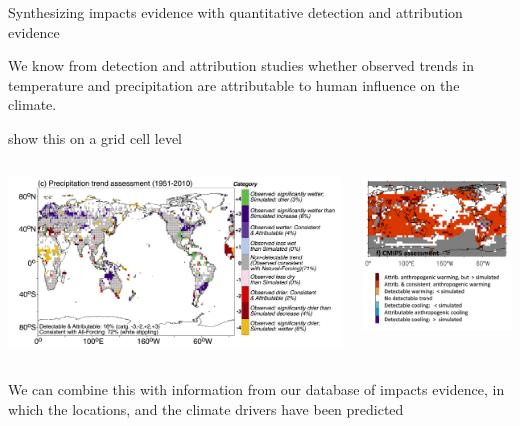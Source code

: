 \documentclass[9pt]{beamer}
\begin{document}
\begin{frame}{Synthesizing impacts evidence with quantitative detection and attribution evidence}

We know from detection and attribution studies whether observed trends in temperature and precipitation are attributable to human influence on the climate.

\cite{Knutson2013, Knutson2018} show this on a grid cell level

\begin{columns}
	\begin{column}{0.65\linewidth}
		\includegraphics[width=\linewidth]{images/knutson_precip_da}
	\end{column}
	\begin{column}{0.35\linewidth}
		\includegraphics[width=\linewidth]{images/knutson_temp_da}
	\end{column}
\end{columns}

We can combine this with information from our database of impacts evidence, in which the locations, and the climate drivers have been predicted

\end{frame}
\end{document}
